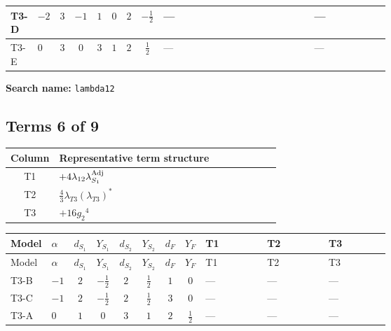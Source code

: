 \documentclass[8pt]{article}
\begin{document}
\begin{landscape}
\begin{longtable}{@{}llcccccc >{\raggedright\arraybackslash}p{0.21\linewidth} >{\raggedright\arraybackslash}p{0.21\linewidth} >{\raggedright\arraybackslash}p{0.21\linewidth}@{}}
\midrule
T3-D & $-2$ & $3$ & $-1$ & $1$ & $0$ & $2$ & $-\frac{1}{2}$ & --- & \scriptsize\adjustbox{max width=\linewidth}{$\begin{gathered} +4 {\lambda_{H1}} {\lambda_{H2}}\end{gathered}$} & --- \\
\midrule
T3-E & $0$ & $3$ & $0$ & $3$ & $1$ & $2$ & $\frac{1}{2}$ & --- & \scriptsize\adjustbox{max width=\linewidth}{$\begin{gathered} +4 {\lambda_{H1}} {\lambda_{H2}}\end{gathered}$} & --- \\
\midrule
\bottomrule
\end{longtable}
\clearpage
\noindent\textbf{Search name: }\texttt{lambda12}\par\smallskip
\subsection*{Terms 6 of 9}
\begin{center}
\begin{tabular}{@{}c >{\raggedright\arraybackslash}p{0.82\linewidth}@{}}
\toprule
Column & Representative term structure \\
\midrule
T1 & \(\displaystyle +4 {\lambda_{12}} {\lambda_{S_1}^{\rm Adj}}\) \\
\midrule
T2 & \(\displaystyle \frac{4}{3} {\lambda_{T3}} \left({\lambda_{T3}}\right)^{*}\) \\
\midrule
T3 & \(\displaystyle +16 {g_2}^4\) \\
\midrule
\bottomrule
\end{tabular}
\end{center}
\smallskip
\tiny
\begin{longtable}{@{}llcccccc >{\raggedright\arraybackslash}p{0.21\linewidth} >{\raggedright\arraybackslash}p{0.21\linewidth} >{\raggedright\arraybackslash}p{0.21\linewidth}@{}}
\toprule
Model & $\alpha$ & $d_{S_1}$ & $Y_{S_1}$ & $d_{S_2}$ & $Y_{S_2}$ & $d_F$ & $Y_F$ & T1 & T2 & T3 \\
\midrule
\endfirsthead
\toprule
Model & $\alpha$ & $d_{S_1}$ & $Y_{S_1}$ & $d_{S_2}$ & $Y_{S_2}$ & $d_F$ & $Y_F$ & T1 & T2 & T3 \\
\midrule
\endhead
T3-B & $-1$ & $2$ & $-\frac{1}{2}$ & $2$ & $\frac{1}{2}$ & $1$ & $0$ & --- & --- & --- \\
\midrule
T3-C & $-1$ & $2$ & $-\frac{1}{2}$ & $2$ & $\frac{1}{2}$ & $3$ & $0$ & --- & --- & --- \\
\midrule
T3-A & $0$ & $1$ & $0$ & $3$ & $1$ & $2$ & $\frac{1}{2}$ & --- & --- & --- \\

\end{longtable}
\end{landscape}
\end{document}
